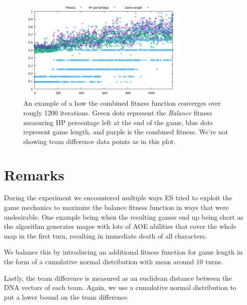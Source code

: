 \begin{figure}
	\centering
	\includegraphics[width=0.75\textwidth]{img/converging-es.png}
	\caption{An example of a how the combined fitness function converges over rougly 1200 iterations. Green dots represent the \emph{Balance} fitness measuring HP percentage left at the end of the game, blue dots represent game length, and purple is the combined fitness. We're not showing team difference data points as in this plot.}
	\label{fig:converging-es}	
\end{figure}

\section{Remarks}

During the experiment we encountered multiple ways ES tried to exploit the
game mechanics to maximize the balance fitness function in ways that were
undesirable. One example being when the resulting games end up being short
as the algorithm generates mages with lots of AOE abilities that cover the
whole map in the first turn, resulting in immediate death of all characters.

We balance this by introducing an additional fitness function for game length
in the form of a cumulative normal distribution with mean around $10$ turns.

Lastly, the team difference is measured as an euclidean distance between the DNA
vectors of each team. Again, we use a cumulative normal distribution to put a lower
bound on the team difference.
